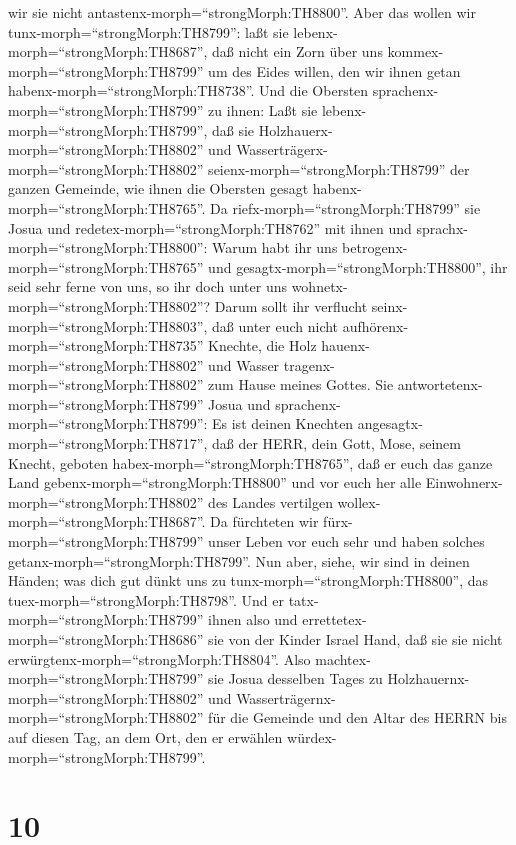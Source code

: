 wir sie nicht antastenx-morph=``strongMorph:TH8800''.  Aber
das wollen wir tunx-morph=``strongMorph:TH8799'': laßt sie
lebenx-morph=``strongMorph:TH8687'', daß nicht ein Zorn über uns
kommex-morph=``strongMorph:TH8799'' um des Eides willen, den wir ihnen
getan habenx-morph=``strongMorph:TH8738''.  Und die
Obersten sprachenx-morph=``strongMorph:TH8799'' zu ihnen: Laßt sie
lebenx-morph=``strongMorph:TH8799'', daß sie
Holzhauerx-morph=``strongMorph:TH8802'' und
Wasserträgerx-morph=``strongMorph:TH8802''
seienx-morph=``strongMorph:TH8799'' der ganzen Gemeinde, wie ihnen die
Obersten gesagt habenx-morph=``strongMorph:TH8765''.  Da
riefx-morph=``strongMorph:TH8799'' sie Josua und
redetex-morph=``strongMorph:TH8762'' mit ihnen und
sprachx-morph=``strongMorph:TH8800'': Warum habt ihr uns
betrogenx-morph=``strongMorph:TH8765'' und
gesagtx-morph=``strongMorph:TH8800'', ihr seid sehr ferne von uns, so
ihr doch unter uns wohnetx-morph=``strongMorph:TH8802''? 
Darum sollt ihr verflucht seinx-morph=``strongMorph:TH8803'', daß unter
euch nicht aufhörenx-morph=``strongMorph:TH8735'' Knechte, die Holz
hauenx-morph=``strongMorph:TH8802'' und Wasser
tragenx-morph=``strongMorph:TH8802'' zum Hause meines Gottes.
 Sie antwortetenx-morph=``strongMorph:TH8799'' Josua und
sprachenx-morph=``strongMorph:TH8799'': Es ist deinen Knechten
angesagtx-morph=``strongMorph:TH8717'', daß der HERR, dein Gott, Mose,
seinem Knecht, geboten habex-morph=``strongMorph:TH8765'', daß er euch
das ganze Land gebenx-morph=``strongMorph:TH8800'' und vor euch her alle
Einwohnerx-morph=``strongMorph:TH8802'' des Landes vertilgen
wollex-morph=``strongMorph:TH8687''. Da fürchteten wir
fürx-morph=``strongMorph:TH8799'' unser Leben vor euch sehr und haben
solches getanx-morph=``strongMorph:TH8799''.  Nun aber,
siehe, wir sind in deinen Händen; was dich gut dünkt uns zu
tunx-morph=``strongMorph:TH8800'', das
tuex-morph=``strongMorph:TH8798''.  Und er
tatx-morph=``strongMorph:TH8799'' ihnen also und
errettetex-morph=``strongMorph:TH8686'' sie von der Kinder Israel Hand,
daß sie sie nicht erwürgtenx-morph=``strongMorph:TH8804''. 
Also machtex-morph=``strongMorph:TH8799'' sie Josua desselben Tages zu
Holzhauernx-morph=``strongMorph:TH8802'' und
Wasserträgernx-morph=``strongMorph:TH8802'' für die Gemeinde und den
Altar des HERRN bis auf diesen Tag, an dem Ort, den er erwählen
würdex-morph=``strongMorph:TH8799''.

\hypertarget{section-9}{%
\section{10}\label{section-9}}

